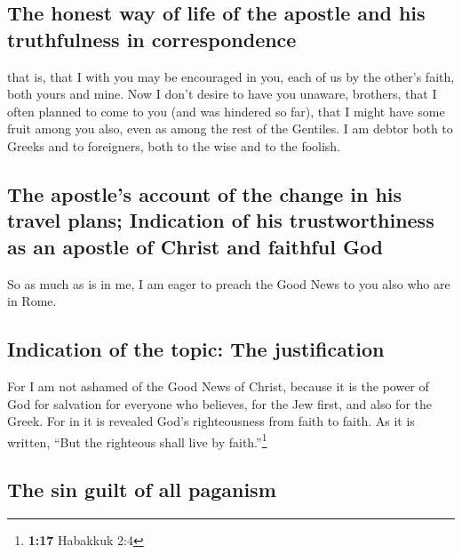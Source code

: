 \hypertarget{the-honest-way-of-life-of-the-apostle-and-his-truthfulness-in-correspondence}{%
\subsection{The honest way of life of the apostle and his truthfulness
in
correspondence}\label{the-honest-way-of-life-of-the-apostle-and-his-truthfulness-in-correspondence}}

 that is, that I with you may be encouraged in you, each
of us by the other's faith, both yours and mine.  Now I
don't desire to have you unaware, brothers, that I often planned to come
to you (and was hindered so far), that I might have some fruit among you
also, even as among the rest of the Gentiles.  I am
debtor both to Greeks and to foreigners, both to the wise and to the
foolish.

\hypertarget{the-apostles-account-of-the-change-in-his-travel-plans-indication-of-his-trustworthiness-as-an-apostle-of-christ-and-faithful-god}{%
\subsection{The apostle's account of the change in his travel plans;
Indication of his trustworthiness as an apostle of Christ and faithful
God}\label{the-apostles-account-of-the-change-in-his-travel-plans-indication-of-his-trustworthiness-as-an-apostle-of-christ-and-faithful-god}}

 So as much as is in me, I am eager to preach the Good
News to you also who are in Rome.

\hypertarget{indication-of-the-topic-the-justification}{%
\subsection{Indication of the topic: The
justification}\label{indication-of-the-topic-the-justification}}

 For I am not ashamed of the Good News of Christ, because
it is the power of God for salvation for everyone who believes, for the
Jew first, and also for the Greek.  For in it is revealed
God's righteousness from faith to faith. As it is written, ``But the
righteous shall live by faith.''\footnote{\textbf{1:17} Habakkuk 2:4}

\hypertarget{the-sin-guilt-of-all-paganism}{%
\subsection{The sin guilt of all
paganism}\label{the-sin-guilt-of-all-paganism}}


